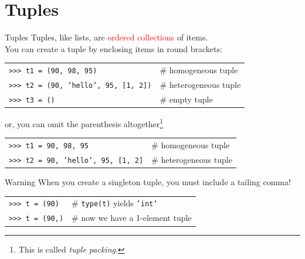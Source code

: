 \documentclass[t,handout,9pt]{beamer}
\begin{document}
\section{Tuples}
\begin{frame}{Tuples}
Tuples, like lists, are \textcolor{red}{ordered collections} of items.\\
You can create a tuple by enclosing items in round brackets:
\begin{table}[]
\begin{flushleft}
\begin{tabular}{ll}
\texttt{>{}>{}> t1 = (90, 98, 95)} & \# homogeneous tuple  \\
\texttt{>{}>{}> t2 = (90, 'hello', 95, [1, 2])} & \# heterogeneous tuple  \\
\texttt{>{}>{}> t3 = ()} & \# empty tuple  \\
\end{tabular}
\end{flushleft}
\end{table}
or, you can omit the parenthesis altogether\footnote{This is called \textit{tuple packing}.}
\begin{table}[]
\begin{flushleft}
\begin{tabular}{ll}
\texttt{>{}>{}> t1 = 90, 98, 95} & \# homogeneous tuple  \\
\texttt{>{}>{}> t2 = 90, 'hello', 95, [1, 2]} & \# heterogeneous tuple  \\
\end{tabular}
\end{flushleft}
\end{table}
\begin{block}{Warning}
When you create a singleton tuple, you must include a tailing comma!
\end{block}
\begin{table}[]
\begin{flushleft}
\begin{tabular}{ll}
\texttt{>{}>{}> t = (90)} & \# \texttt{type(t)} yields \texttt{'int'}  \\
\texttt{>{}>{}> t = (90,)} & \# now we have a 1-element tuple \\
\end{tabular}
\end{flushleft}
\end{table}
\end{frame}
%
\end{document}
